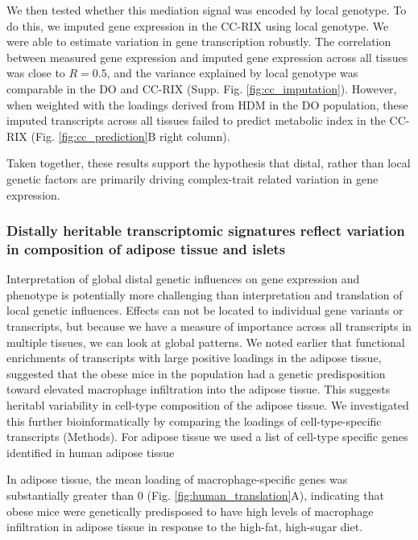 \documentclass[
]{article}
\begin{document}
We then tested whether this mediation signal was encoded by local
genotype. To do this, we imputed gene expression in the CC-RIX using
local genotype. We were able to estimate variation in gene transcription
robustly. The correlation between measured gene expression and imputed
gene expression across all tissues was close to \(R = 0.5\), and the
variance explained by local genotype was comparable in the DO and CC-RIX
(Supp. Fig. \ref{fig:cc_imputation}). However, when weighted with the
loadings derived from HDM in the DO population, these imputed
transcripts across all tissues failed to predict metabolic index in the
CC-RIX (Fig. \ref{fig:cc_prediction}B right column).

Taken together, these results support the hypothesis that distal, rather
than local genetic factors are primarily driving complex-trait related
variation in gene expression.

\subsubsection{Distally heritable transcriptomic signatures reflect
variation in composition of adipose tissue and
islets}\label{distally-heritable-transcriptomic-signatures-reflect-variation-in-composition-of-adipose-tissue-and-islets}

Interpretation of global distal genetic influences on gene expression
and phenotype is potentially more challenging than interpretation and
translation of local genetic influences. Effects can not be located to
individual gene variants or transcripts, but because we have a measure
of importance across all transcripts in multiple tissues, we can look at
global patterns. We noted earlier that functional enrichments of
transcripts with large positive loadings in the adipose tissue,
suggested that the obese mice in the population had a genetic
predisposition toward elevated macrophage infiltration into the adipose
tissue. This suggests heritabl variability in cell-type composition of
the adipose tissue. We investigated this further bioinformatically by
comparing the loadings of cell-type-specific transcripts (Methods). For
adipose tissue we used a list of cell-type specific genes identified in
human adipose tissue

In adipose tissue, the mean loading of macrophage-specific genes was
substantially greater than 0 (Fig. \ref{fig:human_translation}A),
indicating that obese mice were genetically predisposed to have high
levels of macrophage infiltration in adipose tissue in response to the
high-fat, high-sugar diet.
\end{document}
